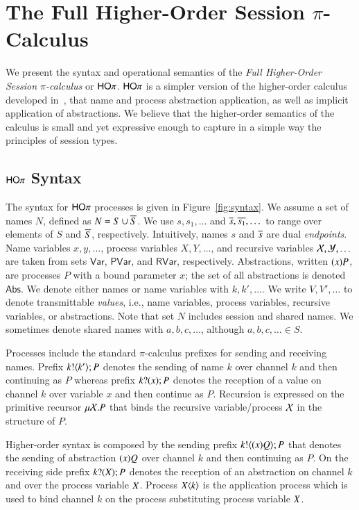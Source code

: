 \section{The Full Higher-Order Session $\pi$-Calculus}

We present the syntax and operational semantics of the
{\em Full Higher-Order Session $\pi$-calculus} or $\mathsf{HO}\pi$.
$\mathsf{HO}\pi$ is a simpler version of the higher-order calculus developed
in~\cite{tlca07}, that name and process abstraction application, as
well as implicit application of abstractions. We believe that
the higher-order semantics of the calculus is small and yet expressive
enough to capture in a simple way the principles of
session types.

\subsection{$\mathsf{HO}\pi$ Syntax}

The syntax for $\mathsf{HO}\pi$ processes is given in Figure~\ref{fig:syntax}.
We assume a set of names $N$, defined as $N = S \cup \overline{S}$.
We use $s, s_1, \dots$ 
and $\overline{s}, \overline{s_1}, \dots$
to range over elements of $S$ and $\overline{S}$, respectively.
Intuitively, names $s$ and $\overline{s}$ are dual \emph{endpoints}.
Name variables $x, y,  \dots$, 
process variables $X, Y,  \dots$,
and recursive variables $\mathcal{X}, \mathcal{Y}, \dots$ 
are taken from sets $\mathsf{Var}$, $\mathsf{PVar}$, and $\mathsf{RVar}$, respectively. 
Abstractions, written $(x)P$, are processes $P$ with a bound parameter $x$;
the set of all abstractions is denoted $\mathsf{Abs}$.
We denote either names or name variables with $k, k', \dots$.
We write $V, V', \ldots$ to denote 
transmittable \emph{values}, i.e., 
name variables, process variables, recursive variables, or abstractions.
Note that set $N$ includes session and shared names.
We sometimes denote shared names with $a,b, c, \dots$, although $a, b, c, \dots \in S$.

Processes include the standard $\pi$-calculus prefixes for sending and receiving names.
Prefix $k ! \langle k' \rangle ; P$ denotes the sending of name $k$ over channel $k$ and then
continuing as $P$ whereas prefix $k ? (x) ; P$ denotes the reception of a value
on channel $k$ over variable $x$ and then continue as $P$. Recursion is expressed
on the primitive recursor $\mu \mathcal{X}. P$ that binds the recursive variable/process
$\mathcal{X}$ in the structure of $P$.

Higher-order syntax is composed by the sending prefix $k ! \langle (x)Q \rangle ; P$ that
denotes the sending of abstraction $(x)Q$ over channel $k$ and then continuing
as $P$. On the receiving side prefix $k ? (X) ; P$ denotes the reception of an abstraction
on channel $k$ and over the process variable $X$. Process $X\langle k \rangle$ is the application
process which is used to bind channel $k$ on the process substituting process variable $X$.

